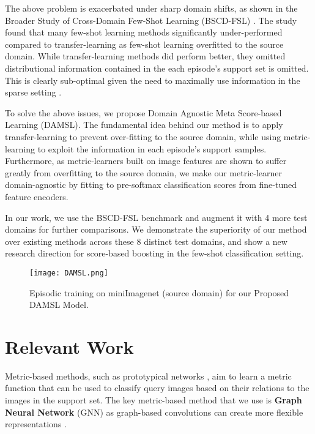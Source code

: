 \documentclass[final]{cvpr}
\begin{document}
The above problem is exacerbated under sharp domain shifts, as shown in the Broader Study of Cross-Domain Few-Shot Learning (BSCD-FSL) \cite{guo2020broader}. The study found that many few-shot learning methods significantly under-performed compared to transfer-learning as few-shot learning overfitted to the source domain. While transfer-learning methods did perform better, they omitted distributional information contained in the each episode's support set is omitted. This is clearly sub-optimal given the need to maximally use information in the sparse setting \cite{zhang2019variational} \cite{triantafillou2017few}.

To solve the above issues, we propose Domain Agnostic Meta Score-based Learning (DAMSL). The fundamental idea behind our method is to apply transfer-learning to prevent over-fitting to the source domain, while using metric-learning to exploit the information in each episode's support samples. Furthermore, as metric-learners built on image features are shown to suffer greatly from overfitting to the source domain, we make our metric-learner domain-agnostic by fitting to pre-softmax classification scores from fine-tuned feature encoders. 

In our work, we use the BSCD-FSL benchmark \cite{guo2020broader} and augment it with 4 more test domains for further comparisons. We demonstrate the superiority of our method over existing methods across these 8 distinct test domains, and show a new research direction for score-based boosting in the few-shot classification setting. 

\begin{figure*}[t]
\begin{center}
   \texttt{[image: DAMSL.png]}
\end{center}
   \caption{Episodic training on miniImagenet (source domain) for our Proposed DAMSL Model.}
\label{fig:DAMSL}
\end{figure*}

\section{Relevant Work}

Metric-based methods, such as prototypical networks \cite{snell2017prototypical}, aim to learn a metric function  that can be used to classify query images based on their relations to the images in the support set. The key metric-based method that we use is \textbf{Graph Neural Network} (GNN) as graph-based convolutions can create more flexible representations \cite{bronstein2017geometric}.
\end{document}
